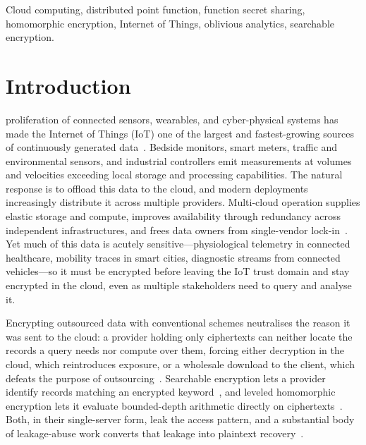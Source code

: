 \documentclass[journal]{IEEEtran}
\begin{document}
\begin{IEEEkeywords}
Cloud computing, distributed point function, function secret sharing, homomorphic encryption, Internet of Things, oblivious analytics, searchable encryption.
\end{IEEEkeywords}

\IEEEpeerreviewmaketitle

\section{Introduction}
\label{sec:intro}
 proliferation of connected sensors, wearables, and cyber-physical systems has made the Internet of Things (IoT) one of the largest and fastest-growing sources of continuously generated data~\cite{yang2025the}. Bedside monitors, smart meters, traffic and environmental sensors, and industrial controllers emit measurements at volumes and velocities exceeding local storage and processing capabilities. The natural response is to offload this data to the cloud, and modern deployments increasingly distribute it across multiple providers. Multi-cloud operation supplies elastic storage and compute, improves availability through redundancy across independent infrastructures, and frees data owners from single-vendor lock-in~\cite{adesina2026enhancing}. Yet much of this data is acutely sensitive---physiological telemetry in connected healthcare, mobility traces in smart cities, diagnostic streams from connected vehicles---so it must be encrypted before leaving the IoT trust domain and stay encrypted in the cloud, even as multiple stakeholders need to query and analyse it.

Encrypting outsourced data with conventional schemes neutralises the reason it was sent to the cloud: a provider holding only ciphertexts can neither locate the records a query needs nor compute over them, forcing either decryption in the cloud, which reintroduces exposure, or a wholesale download to the client, which defeats the purpose of outsourcing~\cite{manjyanaik2024preserving}. Searchable encryption lets a provider identify records matching an encrypted keyword~\cite{islam2023keyword}, and leveled homomorphic encryption lets it evaluate bounded-depth arithmetic directly on ciphertexts~\cite{fan2012somewhat,cryptoeprint:2016/421}. Both, in their single-server form, leak the access pattern, and a substantial body of leakage-abuse work converts that leakage into plaintext recovery~\cite{islam2012access,cash2015leakage,grubbs2017leakage}.
\end{document}
